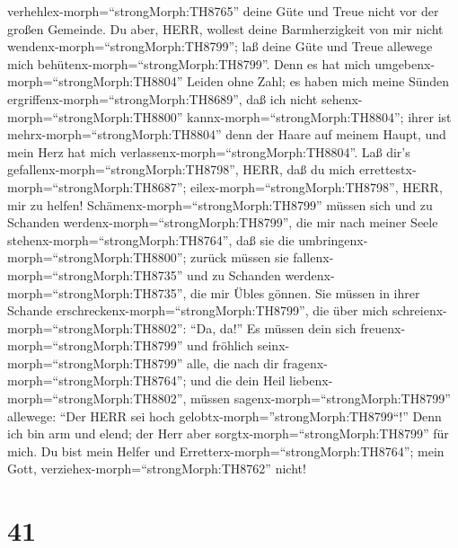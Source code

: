 verhehlex-morph=``strongMorph:TH8765'' deine Güte und Treue nicht vor
der großen Gemeinde.  Du aber, HERR, wollest deine
Barmherzigkeit von mir nicht wendenx-morph=``strongMorph:TH8799''; laß
deine Güte und Treue allewege mich
behütenx-morph=``strongMorph:TH8799''.  Denn es hat mich
umgebenx-morph=``strongMorph:TH8804'' Leiden ohne Zahl; es haben mich
meine Sünden ergriffenx-morph=``strongMorph:TH8689'', daß ich nicht
sehenx-morph=``strongMorph:TH8800'' kannx-morph=``strongMorph:TH8804'';
ihrer ist mehrx-morph=``strongMorph:TH8804'' denn der Haare auf meinem
Haupt, und mein Herz hat mich verlassenx-morph=``strongMorph:TH8804''.
 Laß dir's gefallenx-morph=``strongMorph:TH8798'', HERR,
daß du mich errettestx-morph=``strongMorph:TH8687'';
eilex-morph=``strongMorph:TH8798'', HERR, mir zu helfen! 
Schämenx-morph=``strongMorph:TH8799'' müssen sich und zu Schanden
werdenx-morph=``strongMorph:TH8799'', die mir nach meiner Seele
stehenx-morph=``strongMorph:TH8764'', daß sie die
umbringenx-morph=``strongMorph:TH8800''; zurück müssen sie
fallenx-morph=``strongMorph:TH8735'' und zu Schanden
werdenx-morph=``strongMorph:TH8735'', die mir Übles gönnen.
 Sie müssen in ihrer Schande
erschreckenx-morph=``strongMorph:TH8799'', die über mich
schreienx-morph=``strongMorph:TH8802'': ``Da, da!''  Es
müssen dein sich freuenx-morph=``strongMorph:TH8799'' und fröhlich
seinx-morph=``strongMorph:TH8799'' alle, die nach dir
fragenx-morph=``strongMorph:TH8764''; und die dein Heil
liebenx-morph=``strongMorph:TH8802'', müssen
sagenx-morph=``strongMorph:TH8799'' allewege: ``Der HERR sei hoch
gelobtx-morph=''strongMorph:TH8799``!''  Denn ich bin arm
und elend; der Herr aber sorgtx-morph=``strongMorph:TH8799'' für mich.
Du bist mein Helfer und Erretterx-morph=``strongMorph:TH8764''; mein
Gott, verziehex-morph=``strongMorph:TH8762'' nicht!

\hypertarget{section-40}{%
\section{41}\label{section-40}}

